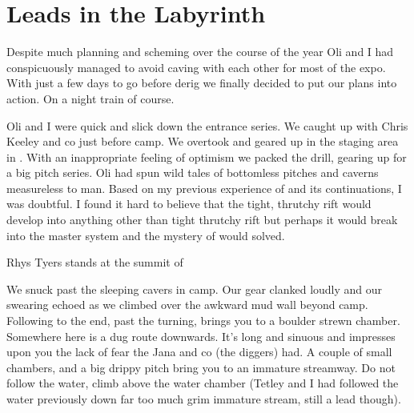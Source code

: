 \section{Leads in the Labyrinth}
 
Despite much planning and scheming over the course of the year Oli and I had conspicuously managed to avoid caving with each other for most of the expo. With just a few days to go before derig we finally decided to put our plans into action. On a night train of course.
 
Oli and I were quick and slick down the entrance series. We caught up with Chris Keeley and co just before camp. We overtook and geared up in the staging area in . With an inappropriate feeling of optimism we packed the drill, gearing up for a big pitch series. Oli had spun wild tales of bottomless pitches and caverns measureless to man. Based on my previous experience of  and its continuations, I was doubtful. I found it hard to believe that the tight, thrutchy rift would develop into anything other than tight thrutchy rift but perhaps it would break into the master system and the mystery of  would solved. 


 \begin{marginfigure}
\centering
{}
\label{Rhys Skrbina}
\caption{Rhys Tyers stands at the summit of \protect{} }
\end{marginfigure}

 
We snuck past the sleeping cavers in camp. Our gear clanked loudly and our swearing echoed as we climbed over the awkward mud wall beyond camp. Following  to the end, past the  turning, brings you to a boulder strewn chamber. Somewhere here is a dug route downwards. It's long and sinuous and impresses upon you the lack of fear the Jana and co (the diggers) had. A couple of small chambers, and a big drippy pitch bring you to an immature streamway. Do not follow the water, climb above the water chamber (Tetley and I had followed the water previously down far too much grim immature stream, still a lead though). 
 
